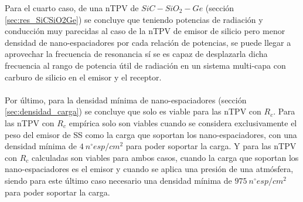 Para el cuarto caso, de una nTPV de $SiC-SiO_2-Ge$ (sección \ref{sec:res_SiCSiO2Ge}) se concluye que teniendo potencias de radiación y conducción muy parecidas al caso de la nTPV de emisor de silicio pero menor densidad de nano-espaciadores por cada relación de potencias, se puede llegar a aprovechar la frecuencia de resonancia sí se es capaz de desplazarla dicha frecuencia al rango de potencia útil de radiación en un sistema multi-capa con carburo de silicio en el emisor y el receptor.\\\\
Por último, para la densidad mínima de nano-espaciadores (sección \ref{sec:densidad_carga}) se concluye que solo es viable para las nTPV con $R_c$. Para las nTPV con $R_c$ empírica solo son viables cuando se considera exclusivamente el peso del emisor de SS como la carga que soportan los nano-espaciadores, con una densidad mínima de $4 \ n^{\circ}esp/cm^2$ para poder soportar la carga. Y para las nTPV con $R_c$ calculadas son viables para ambos casos, cuando la carga que soportan los nano-espaciadores es el emisor y cuando se aplica una presión de una atmósfera, siendo para este último caso necesario una densidad mínima de $975 \ n^{\circ}esp/cm^2$ para poder soportar la carga.\\\\
